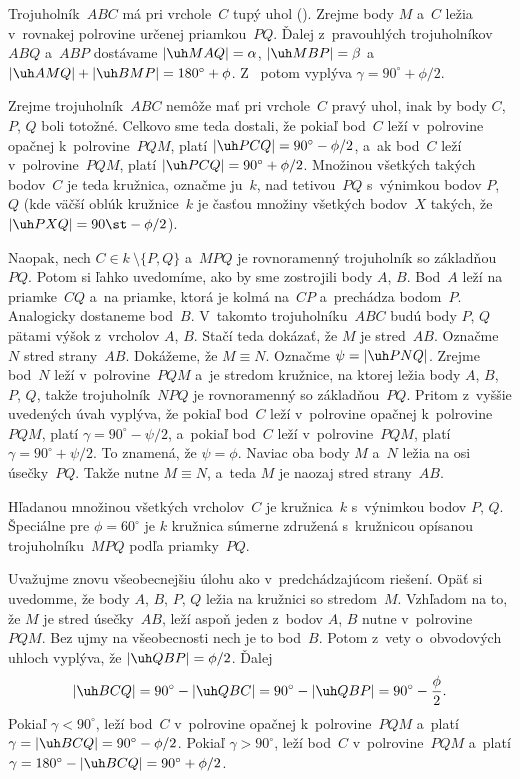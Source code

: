 {\medskip
\line{\hss\inspicture-!\hss\inspicture-!\hss}
\medskip

Trojuholník~$ABC$ má pri vrchole~$C$ tupý uhol (\obr). Zrejme body $M$
a~$C$ ležia v~rovnakej polrovine určenej priamkou~$PQ$. Ďalej z~pravouhlých
trojuholníkov $ABQ$ a~$ABP$ dostávame $ |\uh MAQ| =
\alpha $,  $ |\uh MBP| = \beta $  a~$ |\uh AMQ| + |\uh
BMP| = 180^\circ + \phi $. Z~ potom vyplýva  $ \gamma =
90^\circ + \phi/2 $.

Zrejme trojuholník~$ABC$ nemôže mať pri vrchole~$C$ pravý uhol,
inak by body $C$, $P$, $Q$ boli totožné. Celkovo sme teda dostali,
že pokiaľ bod~$C$ leží v~polrovine opačnej k~polrovine~$PQM$, platí
$|\uh PCQ| = 90^\circ - \phi/2$, a~ak bod~$C$ leží v~polrovine~$PQM$,
platí $ |\uh PCQ| = 90^\circ + \phi/2 $.
Množinou všetkých takých bodov~$C$ je teda kružnica, označme ju~$k$,
nad tetivou~$PQ$ s~výnimkou bodov $P$, $Q$ (kde väčší oblúk
kružnice~$k$ je časťou množiny všetkých bodov~$X$ takých, že
$|\uh PXQ|=90\st-\phi/2$).

\smallskip
Naopak, nech $C \in k~\setminus \{ P,Q \} $ a~$MPQ$ je
rovnoramenný trojuholník so základňou~$PQ$. Potom si ľahko
uvedomíme, ako by sme zostrojili body $A$, $B$. Bod~$A$ leží na
priamke~$CQ$ a~na priamke, ktorá je kolmá na~$CP$ a~prechádza
bodom~$P$. Analogicky dostaneme bod~$B$. V~takomto
trojuholníku~$ABC$ budú body $P$, $Q$ pätami výšok z~vrcholov
$A$, $B$. Stačí teda dokázať, že $M$ je stred~$AB$. Označme $N$
stred strany~$AB$. Dokážeme, že $M\equiv N$. Označme $\psi=|\uh PNQ|$.
Zrejme bod~$N$ leží v~polrovine~$PQM$ a~je stredom
kružnice, na ktorej ležia body $A$, $B$, $P$, $Q$, takže
trojuholník~$NPQ$ je rovnoramenný so základňou~$PQ$. Pritom z~vyššie
uvedených úvah vyplýva, že pokiaľ bod~$C$ leží v~polrovine
opačnej k~polrovine~$PQM$, platí $\gamma=90^\circ-\psi/2$,
a~pokiaľ bod~$C$ leží v~polrovine~$PQM$, platí
$\gamma=90^\circ+\psi/2$. To znamená, že $\psi=\phi$. Naviac
oba body $M$ a~$N$ ležia na osi úsečky~$PQ$. Takže nutne $M\equiv
N$, a~teda $M$ je naozaj stred strany~$AB$.

\odpoved
Hľadanou množinou všetkých vrcholov~$C$ je kružnica~$k$ s~výnimkou
bodov $P$, $Q$. Špeciálne pre $\phi=60^\circ$ je $k$ kružnica
súmerne združená s~kružnicou opísanou trojuholníku~$MPQ$ podľa
priamky~$PQ$.

\ineriesenie
Uvažujme znovu všeobecnejšiu úlohu ako v~predchádzajúcom riešení. Opäť
si uvedomme, že body $A$, $B$, $P$, $Q$ ležia na kružnici so
stredom~$M$. Vzhľadom na to, že $M$ je stred úsečky~$AB$, leží
aspoň jeden z~bodov $A$, $B$ nutne v~polrovine~$PQM$. Bez ujmy
na všeobecnosti nech je to bod~$B$. Potom z~vety o~obvodových
uhloch vyplýva, že $ |\uh QBP| = \phi/2$. Ďalej
$$
  |\uh BCQ| = 90^\circ - |\uh QBC|
            = 90^\circ - |\uh QBP|
            = 90^\circ - \frac{\phi}{2} .
$$
Pokiaľ $\gamma<90^\circ$, leží bod~$C$ v~polrovine opačnej k~polrovine~$PQM$
a~platí $ \gamma = |\uh BCQ| = 90^\circ - \phi/2 $. Pokiaľ $\gamma>90^\circ$,  leží bod~$C$
v~polrovine~$PQM$ a~platí $ \gamma = 180^\circ - |\uh BCQ| =
90^\circ + \phi/2 $.

}
